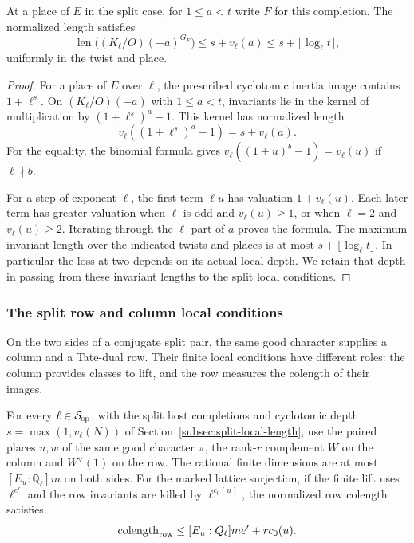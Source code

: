 \begin{lemma}\label{lem:small-prime-scalar-invariants}
At a place of \(E\) in the split case,
for \(1\le a<t\) write \(F\) for this completion. The normalized length satisfies
\[
 \operatorname{len}\bigl((K_\ell/O)(-a)^{G_F}\bigr)\le s+v_\ell(a)\le s+\lfloor\log_\ell t\rfloor ,
\]
uniformly in the twist and place.
\end{lemma}

\begin{proof}
For a place of \(E\) over \(\ell\), the prescribed cyclotomic
inertia image contains \(1+\ell^s\). On
\((K_\ell/O)(-a)\) with \(1\le a<t\), invariants lie in the
kernel of multiplication by
\((1+\ell^s)^a-1\). This kernel has normalized length
\[
     v_\ell((1+\ell^s)^a-1)=s+v_\ell(a).
\]
For the equality, the binomial formula gives
\(v_\ell((1+u)^b-1)=v_\ell(u)\) if \(\ell\nmid b\).

For a step of exponent \(\ell\), the first term \(\ell u\)
has valuation \(1+v_\ell(u)\). Each later term has greater
valuation when \(\ell\) is odd and \(v_\ell(u)\ge1\), or
when \(\ell=2\) and \(v_\ell(u)\ge2\).
Iterating through the \(\ell\)-part of \(a\) proves the
formula. The maximum invariant length over the indicated
twists and places is at most
\(s+\lfloor\log_\ell t\rfloor\). In particular the loss at two depends on its actual local depth. We retain that depth in passing from these invariant lengths to the split local conditions.
\end{proof}

\subsubsection*{The split row and column local conditions}

On the two sides of a conjugate split pair, the same good character supplies a column and a Tate-dual row. Their finite local conditions have different roles: the column provides classes to lift, and the row measures the colength of their images.

\begin{lemma}\label{lem:small-split-finite-colength}
For every \(\ell\in\mathcal S_{\rm sp}\), with the split host
completions and cyclotomic depth \(s=\max(1,v_\ell(N))\)
of Section~\ref{subsec:split-local-length}, use the paired
places \(u,w\) of the same good character \(\pi\), the rank-\(r\) complement
\(W\) on the column and \(W^\vee(1)\) on the row.
The rational finite dimensions are at most
\([E_u:\mathbb Q_\ell]m\) on both sides. For the marked lattice
surjection, if the finite lift uses \(\ell^{e'}\) and the row
invariants are killed by \(\ell^{c_0(u)}\), the normalized row colength satisfies
\[
 \operatorname{colength}_{\rm row}\le [E_u:\mathbb Q_\ell]m e'+rc_0(u).
\]
\end{lemma}

